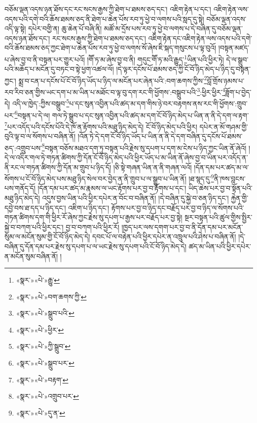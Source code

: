 བཅོམ་ལྡན་འདས་ཉན་ཐོས་དང་རང་སངས་རྒྱས་ཀྱི་ཐེག་པ་ཐམས་ཅད་དང་། འཇིག་རྟེན་པ་དང་། འཇིག་རྟེན་ལས་འདས་པའི་དགེ་བའི་ཆོས་ཐམས་ཅད་ནི་ཐེག་པ་ཆེན་པོས་རབ་ཏུ་ཕྱེ་བ་ལགས་པའི་སླད་དུ་སྟེ། བཅོམ་ལྡན་འདས་འདི་ལྟ་སྟེ། དཔེར་བགྱི་ན། ཆུ་ཆེན་པོ་བཞི་ནི། མཚོ་མ་དྲོས་པས་རབ་ཏུ་ཕྱེ་བ་ལགས་པ་དེ་བཞིན་དུ་བཅོམ་ལྡན་འདས་ཉན་ཐོས་དང་། རང་སངས་རྒྱས་ཀྱི་ཐེག་པ་ཐམས་ཅད་དང་། འཇིག་རྟེན་དང་འཇིག་རྟེན་ལས་འདས་པའི་དགེ་བའི་ཆོས་ཐམས་ཅད་ཀྱང་ཐེག་པ་ཆེན་པོས་རབ་ཏུ་ཕྱེ་བ་ལགས་སོ་ཞེས་ཇི་སྐད་གསུངས་པ་ལྟ་བུའོ། །བསྟན་མཛད་པ་ཞེས་བྱ་བ་ནི་བསྟན་པར་གྱུར་པའོ། །གཽ་ཏ་མ་ཞེས་བྱ་བ་ནི། གདུང་གཽ་ཏ་མའི་རྒྱུད་\footnote{«སྣར་»«པེ་»རྒྱུ་}ཡིན་པའི་ཕྱིར་ཏེ། དེ་ལ་སྒྲུབ་པའི་མཆོད་པ་མངོན་དུ་བཏང་བ་སྟེ་ཕྱག་འཚལ་ལོ། །དེ་ལྟར་དངོས་པོ་ཐམས་ཅད་ཀྱི་ངོ་བོ་ཉིད་མེད་པ་ཉིད་དུ་བསྟན་ཀྱང་། སྨྲ་བ་ངན་པ་དངོས་པོ་ངོ་བོ་ཉིད་ཡོད་པ་ཉིད་ལ་མངོན་པར་ཞེན་པའི་:བག་ཆགས་ཀྱིས་\footnote{«སྣར་»«པེ་»བག་ཆགས་ཀྱི་}བློ་གྲོས་ཉམས་པ་རབ་རིབ་ཅན་གྱིས་ཡང་དག་པ་མ་ཡིན་པ་མཐོང་བ་ལྟ་བུ་དག་རང་གི་ཕྱོགས་:བསྒྲུབ་པའི་\footnote{«སྣར་»«པེ་»སྒྲུབ་པའི་}:ཕྱིར་ཕྱིར་\footnote{«སྣར་»«པེ་»ཕྱིར་}ཟློག་པ་བྱེད་དེ། འདི་ལ་ཁྱེད་:ཀྱིས་བསྒྲུབ་\footnote{«སྣར་»«པེ་»ཀྱི་སྒྲུབ་}པ་དང་སུན་འབྱིན་པའི་ཚད་མ་དག་གིས་ཉེ་བར་བརྟགས་ནས་རང་གི་ཕྱོགས་:གྲུབ་པར་\footnote{«སྣར་»«པེ་»སྒྲུབ་པར་}བསྟན་པ་དེ་ལ། གལ་ཏེ་སྒྲུབ་པ་དང་སུན་འབྱིན་པའི་ཚད་མ་དག་ངོ་བོ་ཉིད་མེད་པ་ཡིན་ན་ནི་དེ་དག་ལ་རྟག་\footnote{«སྣར་»«པེ་»བརྟག་}པར་འདོད་པའི་དངོས་པོའི་དེ་ཁོ་ན་རྟོགས་པའི་མཐུ་ཉིད་མེད་དེ། ངོ་བོ་ཉིད་མེད་པའི་ཕྱིར། དཔེར་ན་མོ་གཤམ་གྱི་བུའི་ལྟ་བ་ལ་སོགས་པ་བཞིན་ནོ། །འོན་ཏེ་དེ་དག་ངོ་བོ་ཉིད་ཡོད་པ་ཡིན་ན་ནི་དེ་དག་བཞིན་དུ་དངོས་པོ་ཐམས་ཅད་:འགྲུབ་པས་\footnote{«སྣར་»«པེ་»འགྲུབ་པར་}བསྟན་བཅོས་མཐའ་དག་ཏུ་བསྟན་པའི་རྗེས་སུ་དཔག་པ་དག་མ་ངེས་པ་ཉིད་ཀྱང་ཡིན་ནོ་ཞེའོ། །དེ་ལ་འདིར་གལ་ཏེ་གཏན་ཚིགས་ཀྱི་དོན་ངོ་བོ་ཉིད་མེད་པའི་ཕྱིར་ཡོད་པ་མ་ཡིན་ནོ་ཞེས་བྱ་བ་ཡིན་པར་འདོད་ན་ནི་རང་ལ་གཏན་ཚིགས་ཀྱི་དོན་མ་གྲུབ་པ་ཉིད་དོ། །ཅི་སྟེ་གཞན་ཡིན་ན་ནི་གཞན་ལའོ། །དོན་དམ་པར་ཚད་མ་ལ་སོགས་པ་ངོ་བོ་ཉིད་མེད་པས་མཐུ་ཉིད་སེལ་བར་བྱེད་ན་ནི་གྲུབ་པ་ལ་སྒྲུབ་པ་ཡིན་ནོ། །ཐ་སྙད་དུ་\footnote{«སྣར་»«པེ་»དུ་ན་}ནི་ཁས་བླངས་པས་གནོད་དོ། །དོན་དམ་པར་ཚད་མ་རྣམས་ལ་ཡང་རྟོགས་པར་བྱ་བ་རྟོགས་པ་དང་། ཡིད་ཆེས་པར་བྱ་བ་སྟོན་པའི་མཐུ་ཉིད་མེད་དེ། འདུས་བྱས་ཡིན་པའི་ཕྱིར་དཔེར་ན་བོང་བ་བཞིན་ནོ། །དེ་བཞིན་དུ་སྐྱེ་བ་ཅན་ཉིད་དང་། རྐྱེན་གྱི་དབྱེ་བས་ཐ་དད་པ་ཉིད་དང་། འཇིག་པ་ཉིད་དང་། རྟོགས་པར་བྱ་བ་ཉིད་དང་བརྗོད་པར་བྱ་བ་ཉིད་ལ་སོགས་པའི་གཏན་ཚིགས་དག་གི་ཕྱིར་རོ་ཞེས་ཀྱང་རྗེས་སུ་དཔག་པ་རྒྱས་པར་བརྗོད་པར་བྱ་སྟེ། སྔར་བསྟན་པའི་ཚུལ་གྱིས་སྤྱིར་སྐྱེ་བ་བཀག་པའི་ཕྱིར་དང་། བྱ་བ་བཀག་པའི་ཕྱིར་རོ། །ཁྱད་པར་ལས་དགག་པར་བྱ་བ་ནི་དོན་དམ་པར་མངོན་སུམ་ལ་མངོན་སུམ་གྱི་ངོ་བོ་ཉིད་མེད་དེ། དབང་པོ་ལ་བརྟེན་པའི་ཕྱིར་དཔེར་ན་འཁྲུལ་པའི་ཤེས་པ་བཞིན་ནོ། །དེ་བཞིན་དུ་དོན་དམ་པར་རྗེས་སུ་དཔག་པ་ལ་ཡང་རྗེས་སུ་དཔག་པའི་ངོ་བོ་ཉིད་མེད་དེ། ཚད་མ་ཡིན་པའི་ཕྱིར་དཔེར་ན་མངོན་སུམ་བཞིན་ནོ། །

